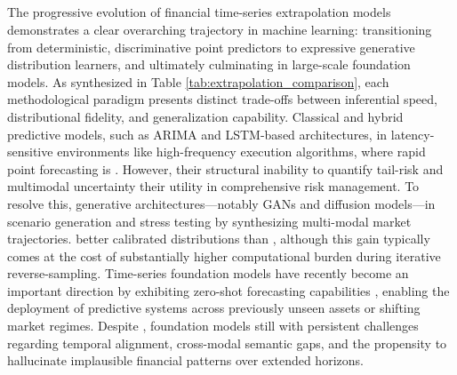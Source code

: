 \subsection{}
The progressive evolution of financial time-series extrapolation models demonstrates a clear overarching trajectory in machine learning: transitioning from deterministic, discriminative point predictors to expressive generative distribution learners, and ultimately culminating in large-scale foundation models. As synthesized in Table \ref{tab:extrapolation_comparison}, each methodological paradigm presents distinct trade-offs between inferential speed, distributional fidelity, and generalization capability. Classical and hybrid predictive models, such as ARIMA and LSTM-based architectures, in latency-sensitive environments like high-frequency execution algorithms, where rapid point forecasting is . However, their structural inability to quantify tail-risk and multimodal uncertainty their utility in comprehensive risk management. To resolve this, generative architectures—notably GANs and diffusion models—in scenario generation and stress testing by synthesizing multi-modal market trajectories. better calibrated distributions than , although this gain typically comes at the cost of substantially higher computational burden during iterative reverse-sampling. Time-series foundation models have recently become an important direction by exhibiting zero-shot forecasting capabilities , enabling the deployment of predictive systems across previously unseen assets or shifting market regimes. Despite , foundation models still with persistent challenges regarding temporal alignment, cross-modal semantic gaps, and the propensity to hallucinate implausible financial patterns over extended horizons.

